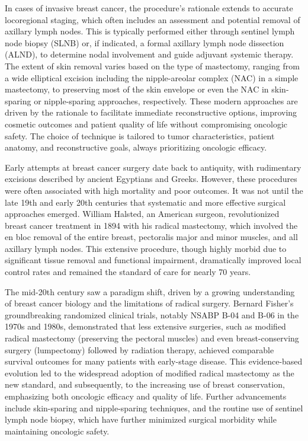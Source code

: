 In cases of invasive breast cancer, the procedure's rationale extends to accurate locoregional staging, which often includes an assessment and potential removal of axillary lymph nodes. This is typically performed either through sentinel lymph node biopsy (SLNB) or, if indicated, a formal axillary lymph node dissection (ALND), to determine nodal involvement and guide adjuvant systemic therapy. The extent of skin removal varies based on the type of mastectomy, ranging from a wide elliptical excision including the nipple-areolar complex (NAC) in a simple mastectomy, to preserving most of the skin envelope or even the NAC in skin-sparing or nipple-sparing approaches, respectively. These modern approaches are driven by the rationale to facilitate immediate reconstructive options, improving cosmetic outcomes and patient quality of life without compromising oncologic safety. The choice of technique is tailored to tumor characteristics, patient anatomy, and reconstructive goals, always prioritizing oncologic efficacy.

Early attempts at breast cancer surgery date back to antiquity, with rudimentary excisions described by ancient Egyptians and Greeks. However, these procedures were often associated with high mortality and poor outcomes. It was not until the late 19th and early 20th centuries that systematic and more effective surgical approaches emerged. William Halsted, an American surgeon, revolutionized breast cancer treatment in 1894 with his radical mastectomy, which involved the en bloc removal of the entire breast, pectoralis major and minor muscles, and all axillary lymph nodes. This extensive procedure, though highly morbid due to significant tissue removal and functional impairment, dramatically improved local control rates and remained the standard of care for nearly 70 years.

The mid-20th century saw a paradigm shift, driven by a growing understanding of breast cancer biology and the limitations of radical surgery. Bernard Fisher's groundbreaking randomized clinical trials, notably NSABP B-04 and B-06 in the 1970s and 1980s, demonstrated that less extensive surgeries, such as modified radical mastectomy (preserving the pectoral muscles) and even breast-conserving surgery (lumpectomy) followed by radiation therapy, achieved comparable survival outcomes for many patients with early-stage disease. This evidence-based evolution led to the widespread adoption of modified radical mastectomy as the new standard, and subsequently, to the increasing use of breast conservation, emphasizing both oncologic efficacy and quality of life. Further advancements include skin-sparing and nipple-sparing techniques, and the routine use of sentinel lymph node biopsy, which have further minimized surgical morbidity while maintaining oncologic safety.

